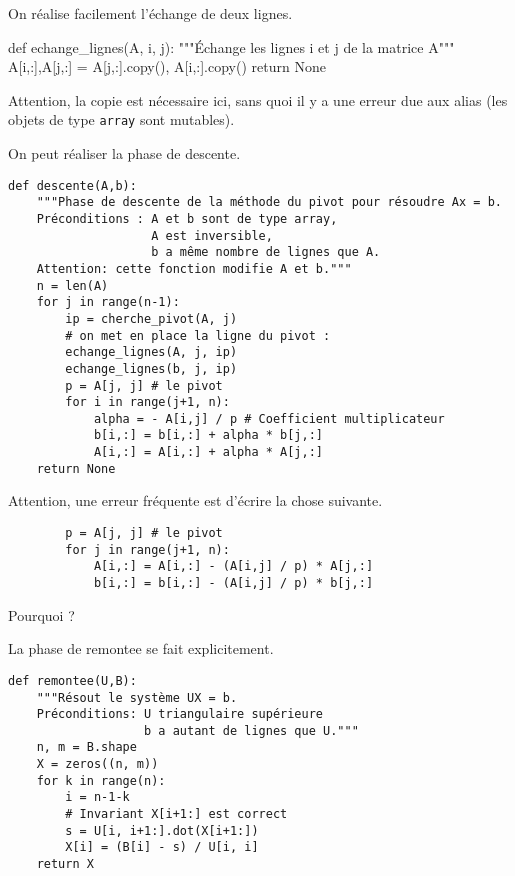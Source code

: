 \medskip{}

On réalise facilement l'échange de deux lignes.
\begin{pyverbatim}
def echange_lignes(A, i, j):
    """Échange les lignes i et j de la matrice A"""
    A[i,:],A[j,:] = A[j,:].copy(), A[i,:].copy()
    return None
\end{pyverbatim}
Attention, la copie est nécessaire ici, sans quoi il y a une erreur due aux alias (les objets de type \texttt{array} sont mutables).



\medskip{}

On peut réaliser la phase de descente.
\begin{lstlisting}
def descente(A,b):
    """Phase de descente de la méthode du pivot pour résoudre Ax = b.
    Préconditions : A et b sont de type array,
                    A est inversible,
                    b a même nombre de lignes que A.
    Attention: cette fonction modifie A et b."""
    n = len(A)
    for j in range(n-1):
        ip = cherche_pivot(A, j)
        # on met en place la ligne du pivot :
        echange_lignes(A, j, ip)
        echange_lignes(b, j, ip)
        p = A[j, j] # le pivot
        for i in range(j+1, n):
            alpha = - A[i,j] / p # Coefficient multiplicateur
            b[i,:] = b[i,:] + alpha * b[j,:]
            A[i,:] = A[i,:] + alpha * A[j,:]
    return None
\end{lstlisting}


\medskip{}

\begin{rem}
Attention, une erreur fréquente est d'écrire la chose suivante. 
\begin{lstlisting}
        p = A[j, j] # le pivot
        for j in range(j+1, n):
            A[i,:] = A[i,:] - (A[i,j] / p) * A[j,:]
            b[i,:] = b[i,:] - (A[i,j] / p) * b[j,:]
\end{lstlisting}
Pourquoi ? 
\end{rem}

\medskip{}

La phase de remontee se fait explicitement.
\begin{lstlisting}
def remontee(U,B):
    """Résout le système UX = b.
    Préconditions: U triangulaire supérieure
                   b a autant de lignes que U."""
    n, m = B.shape
    X = zeros((n, m))
    for k in range(n):
        i = n-1-k
        # Invariant X[i+1:] est correct
        s = U[i, i+1:].dot(X[i+1:])
        X[i] = (B[i] - s) / U[i, i]
    return X
\end{lstlisting}

